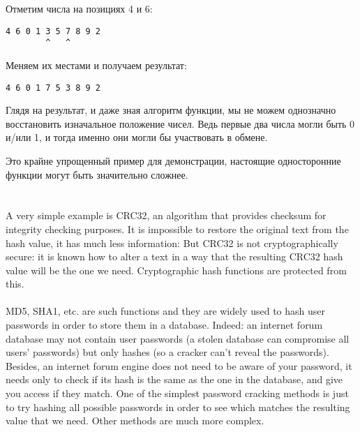 Отметим числа на позициях 4 и 6:

\begin{lstlisting}
4 6 0 1 3 5 7 8 9 2
        ^   ^
\end{lstlisting}

Меняем их местами и получаем результат:

\begin{lstlisting}
4 6 0 1 7 5 3 8 9 2
\end{lstlisting}

Глядя на результат, и даже зная алгоритм функции, мы не можем однозначно восстановить изначальное
положение чисел.
Ведь первые два числа могли быть 0 и/или 1, и тогда именно они могли бы участвовать в обмене.

Это крайне упрощенный пример для демонстрации, настоящие односторонние функции могут быть значительно сложнее.
\fi %


\ifdefined\ENGLISH
\newcommand{\HashFuncChapterName}{%
}
\section{\HashFuncChapterName}
\label{hash_func}

\myindex{\HashFuncChapterName}
A very simple example is CRC32, an algorithm that provides  checksum for integrity checking purposes.
It is impossible to restore the original text from the hash value, it has much less information:
But CRC32 is not cryptographically secure: it is known how to alter a text in a way that the resulting
CRC32 hash value will be the one we need.
Cryptographic hash functions are protected from this. \\
\\
MD5, SHA1, etc. are such functions and they are widely used to hash user passwords in order to store them in a database.
Indeed: an internet forum database may not contain user passwords 
(a stolen database can compromise all users' passwords) but only hashes 
(so a cracker can't reveal the passwords).
Besides, an internet forum engine does not need to be aware of your password, it needs only to check if its hash
is the same as the one in the database, and give you access if they match.
One of the simplest password cracking methods is just to try hashing all possible passwords in order
to see which matches the resulting value that we need.
Other methods are much more complex.

